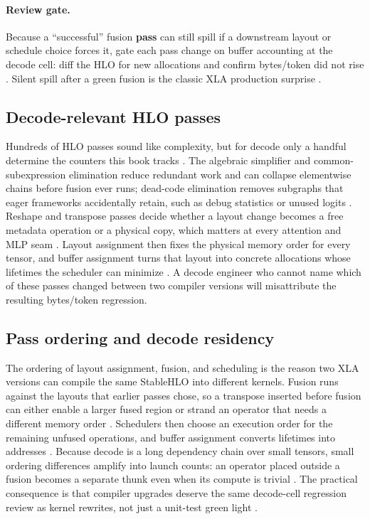 \paragraph{Review gate.} Because a ``successful'' fusion \textbf{pass} can still spill if a downstream layout or schedule choice forces it, gate each pass change on buffer accounting at the decode cell: diff the HLO for new allocations and confirm bytes/token did not rise \citep{openxla2024,memoryfloor2026}. Silent spill after a green fusion is the classic XLA production surprise \citep{taxbreak2026,patel2025llminference}.

\subsection{Decode-relevant HLO passes}

Hundreds of HLO passes sound like complexity, but for decode only a handful determine the counters this book tracks \citep{openxla2024}. The algebraic simplifier and common-subexpression elimination reduce redundant work and can collapse elementwise chains before fusion ever runs; dead-code elimination removes subgraphs that eager frameworks accidentally retain, such as debug statistics or unused logits \citep{openxla2024,memoryfloor2026}. Reshape and transpose passes decide whether a layout change becomes a free metadata operation or a physical copy, which matters at every attention and MLP seam \citep{patel2025llminference,semianalysis2024tma}. Layout assignment then fixes the physical memory order for every tensor, and buffer assignment turns that layout into concrete allocations whose lifetimes the scheduler can minimize \citep{openxla2024}. A decode engineer who cannot name which of these passes changed between two compiler versions will misattribute the resulting bytes/token regression.

\subsection{Pass ordering and decode residency}

The ordering of layout assignment, fusion, and scheduling is the reason two XLA versions can compile the same StableHLO into different kernels. Fusion runs against the layouts that earlier passes chose, so a transpose inserted before fusion can either enable a larger fused region or strand an operator that needs a different memory order \citep{openxla2024,chen2020compilerbasedhardw}. Schedulers then choose an execution order for the remaining unfused operations, and buffer assignment converts lifetimes into addresses \citep{openxla2024}. Because decode is a long dependency chain over small tensors, small ordering differences amplify into launch counts: an operator placed outside a fusion becomes a separate thunk even when its compute is trivial \citep{taxbreak2026,patel2025llminference}. The practical consequence is that compiler upgrades deserve the same decode-cell regression review as kernel rewrites, not just a unit-test green light \citep{memoryfloor2026,yirage2026}.

